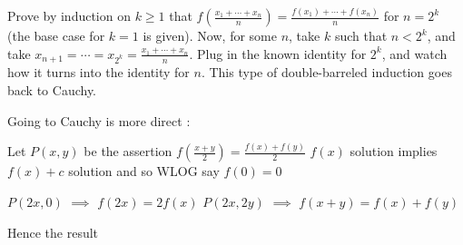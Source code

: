 \begin{solution}
	Prove by induction on $k\geq 1$ that $f\left (\frac{x_1+\cdots+x_n}{n}\right )=\frac{f(x_1)+\cdots+f(x_n)}{n}$ for $n=2^k$ (the base case for $k=1$ is given). Now, for some $n$, take $k$ such that $n<2^k$, and take $x_{n+1} = \cdots = x_{2^k} = \frac {x_1+\cdots + x_n} {n}$. Plug in the known identity for $2^k$, and watch how it turns into the identity for $n$. This type of double-barreled induction goes back to Cauchy.
\end{solution}



\begin{solution}
	Going to Cauchy is more direct : 

Let $P(x,y)$ be the assertion $f(\frac{x+y}2)=\frac{f(x)+f(y)}2$
$f(x)$ solution implies $f(x)+c$ solution and so WLOG say $f(0)=0$

$P(2x,0)$ $\implies$ $f(2x)=2f(x)$
$P(2x,2y)$ $\implies$ $f(x+y)=f(x)+f(y)$

Hence the result
\end{solution}



